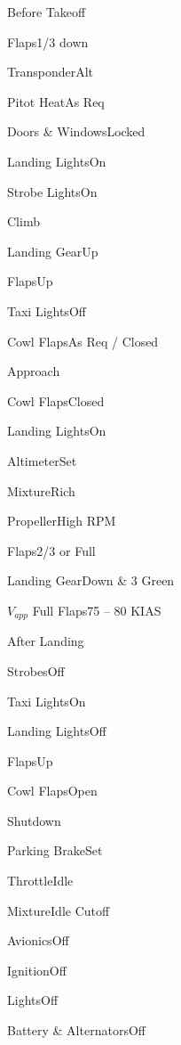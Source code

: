 \documentclass[sim-use]{checklist}
\begin{document}
\begin{checklist}{Before Takeoff}
  \item{Flaps}{1/3 down}
  \item{Transponder}{Alt}
  \item{Pitot Heat}{As Req}
  \item{Doors \& Windows}{Locked}
  \item{Landing Lights}{On}
  \item{Strobe Lights}{On}
\end{checklist}

\begin{checklist}{Climb}
  \item{Landing Gear}{Up}
  \item{Flaps}{Up}
  \item{Taxi Lights}{Off}
  \item{Cowl Flaps}{As Req / Closed}
\end{checklist}

\begin{checklist}{Approach}
  \item{Cowl Flaps}{Closed}
  \item{Landing Lights}{On}
  \item{Altimeter}{Set}
  \item{Mixture}{Rich}
  \item{Propeller}{High RPM}
  \item{Flaps}{2/3 or Full}
  \item{Landing Gear}{Down \& 3 Green}
  \item{$V_{app}$ Full Flaps}{75 -- 80 KIAS}
\end{checklist}

\begin{checklist}{After Landing}
  \item{Strobes}{Off}
  \item{Taxi Lights}{On}
  \item{Landing Lights}{Off}
  \item{Flaps}{Up}
  \item{Cowl Flaps}{Open}
\end{checklist}

\begin{checklist}{Shutdown}
  \item{Parking Brake}{Set}
  \item{Throttle}{Idle}
  \item{Mixture}{Idle Cutoff}
  \item{Avionics}{Off}
  \item{Ignition}{Off}
  \item{Lights}{Off}
  \item{Battery \& Alternators}{Off}
\end{checklist}
\end{document}
